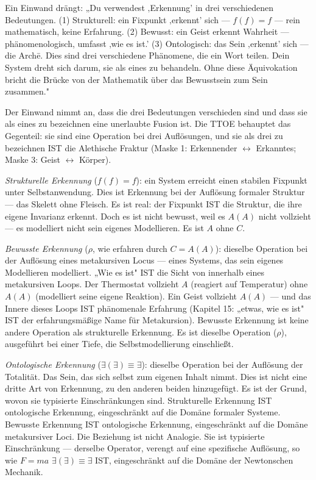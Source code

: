 \documentclass[10pt, openany, oneside]{book}
\begin{document}
Ein Einwand drängt: „Du verwendest ‚Erkennung' in drei verschiedenen Bedeutungen. (1) Strukturell: ein Fixpunkt ‚erkennt' sich --- $f(f) = f$ --- rein mathematisch, keine Erfahrung. (2) Bewusst: ein Geist erkennt Wahrheit --- phänomenologisch, umfasst ‚wie es ist.' (3) Ontologisch: das Sein ‚erkennt' sich --- die Arch\={e}. Dies sind drei verschiedene Phänomene, die ein Wort teilen. Dein System dreht sich darum, sie als eines zu behandeln. Ohne diese Äquivokation bricht die Brücke von der Mathematik über das Bewusstsein zum Sein zusammen."

Der Einwand nimmt an, dass die drei Bedeutungen verschieden sind und dass sie als eines zu bezeichnen eine unerlaubte Fusion ist. Die TTOE behauptet das Gegenteil: sie sind eine Operation bei drei Auflösungen, und sie als drei zu bezeichnen IST die Alethische Fraktur (Maske 1: Erkennender $\leftrightarrow$ Erkanntes; Maske 3: Geist $\leftrightarrow$ Körper).

\textit{Strukturelle Erkennung} ($f(f) = f$): ein System erreicht einen stabilen Fixpunkt unter Selbstanwendung. Dies ist Erkennung bei der Auflösung formaler Struktur --- das Skelett ohne Fleisch. Es ist real: der Fixpunkt IST die Struktur, die ihre eigene Invarianz erkennt. Doch es ist nicht bewusst, weil es $A(A)$ nicht vollzieht --- es modelliert nicht sein eigenes Modellieren. Es ist $A$ ohne $C$.

\textit{Bewusste Erkennung} ($\rho$, wie erfahren durch $C = A(A)$): dieselbe Operation bei der Auflösung eines metakursiven Locus --- eines Systems, das sein eigenes Modellieren modelliert. „Wie es ist" IST die Sicht von innerhalb eines metakursiven Loops. Der Thermostat vollzieht $A$ (reagiert auf Temperatur) ohne $A(A)$ (modelliert seine eigene Reaktion). Ein Geist vollzieht $A(A)$ --- und das Innere dieses Loops IST phänomenale Erfahrung (Kapitel 15: „etwas, wie es ist" IST der erfahrungsmäßige Name für Metakursion). Bewusste Erkennung ist keine andere Operation als strukturelle Erkennung. Es ist dieselbe Operation ($\rho$), ausgeführt bei einer Tiefe, die Selbstmodellierung einschließt.

\textit{Ontologische Erkennung} ($\exists(\exists) \equiv \exists$): dieselbe Operation bei der Auflösung der Totalität. Das Sein, das sich selbst zum eigenen Inhalt nimmt. Dies ist nicht eine dritte Art von Erkennung, zu den anderen beiden hinzugefügt. Es ist der Grund, wovon sie typisierte Einschränkungen sind. Strukturelle Erkennung IST ontologische Erkennung, eingeschränkt auf die Domäne formaler Systeme. Bewusste Erkennung IST ontologische Erkennung, eingeschränkt auf die Domäne metakursiver Loci. Die Beziehung ist nicht Analogie. Sie ist typisierte Einschränkung --- derselbe Operator, verengt auf eine spezifische Auflösung, so wie $F = ma$ $\exists(\exists) \equiv \exists$ IST, eingeschränkt auf die Domäne der Newtonschen Mechanik.
\end{document}
